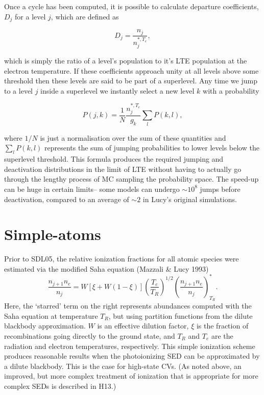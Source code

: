 Once a cycle has been computed, it is possible to calculate departure coefficients, $D_j$
for a level $j$, which are defined as

\begin{equation}
D_j = \frac{n_j}{n_j^{*,T_e}},
\end{equation}

which is simply the ratio of a level's population to it's LTE population at the electron temperature.
If these coefficients approach unity at all levels above some threshold then these
levels are said to be part of a superlevel. Any time we jump to a level $j$ inside a superlevel
we instantly select a new level $k$ with a probability

\begin{equation}
P(j,k) = \frac{1}{N} \frac{n_j^{*,T_e}}{g_k} \sum_l P(k,l),
\end{equation}
 
where $1/N$ is just a normalisation over the sum of these quantities and $\sum_l P(k,l)$ represents 
the sum of jumping probabilities to lower levels below the superlevel threshold.
This formula produces the required jumping and deactivation distributions in the limit of LTE
without having to actually go through the lengthy process of MC sampling the probability space.
The speed-up can be huge in certain limits-- some models can undergo $\sim10^8$ jumps before deactivation,
compared to an average of $\sim2$ in Lucy's original simulations.

\section{Simple-atoms}

Prior to SDL05, the relative ionization fractions for all atomic
species were estimated via the modified Saha equation (Mazzali \&
Lucy 1993)  
\begin{equation}
\frac{n_{j+1} n_e}{n_j} = W [\xi + W(1-\xi)]
\left(\frac{T_e}{T_R}\right)^{1/2}
\left(\frac{n_{j+1}n_e}{n_j}\right)^*_{T_R}. \label{ionization}
\end{equation}
Here, the `starred' term on the right represents abundances computed with
the Saha equation at temperature $T_R$, but using partition functions
from the dilute blackbody approximation. 
$W$ is an effective dilution factor, $\xi$ is the
fraction of recombinations going directly to the ground state, and
$T_R$ and $T_e$ are the radiation and electron temperatures,
respectively. This simple ionization scheme produces reasonable
results when the photoionizing SED can be approximated by a dilute
blackbody. This is the case for high-state CVs. (As noted above, an
improved, but more complex treatment of ionization that is appropriate
for more complex SEDs is described in H13.) 

